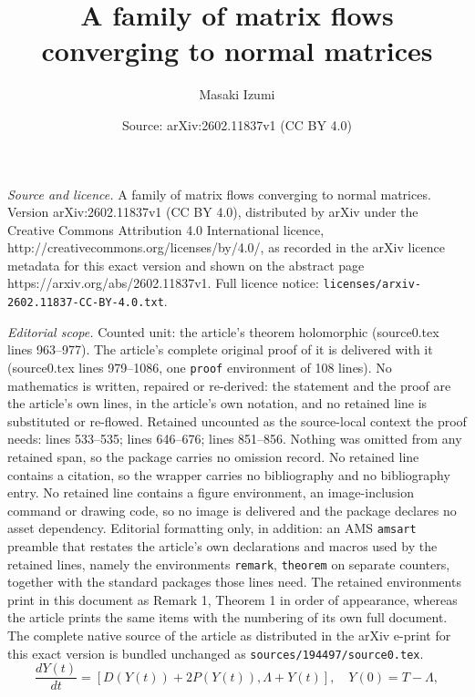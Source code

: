 \documentclass[10pt,a4paper]{amsart}
\title{A family of matrix flows converging to normal matrices}
\author{Masaki Izumi}
\date{Source: arXiv:2602.11837v1 (CC BY 4.0)}
\begin{document}
\maketitle

\noindent\emph{Source and licence.} A family of matrix flows converging to normal matrices. Version arXiv:2602.11837v1 (CC BY 4.0), distributed by arXiv under the Creative Commons Attribution 4.0 International licence, http://creativecommons.org/licenses/by/4.0/, as recorded in the arXiv licence metadata for this exact version and shown on the abstract page https://arxiv.org/abs/2602.11837v1. Full licence notice: \texttt{licenses/arxiv-2602.11837-CC-BY-4.0.txt}.\par\smallskip

\noindent\textit{Editorial scope.} Counted unit: the article's theorem holomorphic (source0.tex lines 963--977). The article's complete original proof of it is delivered with it (source0.tex lines 979--1086, one \texttt{proof} environment of 108 lines). No mathematics is written, repaired or re-derived: the statement and the proof are the article's own lines, in the article's own notation, and no retained line is substituted or re-flowed.  Retained uncounted as the source-local context the proof needs: lines 533--535; lines 646--676; lines 851--856.  Nothing was omitted from any retained span, so the package carries no omission record.  No retained line contains a citation, so the wrapper carries no bibliography and no bibliography entry.  No retained line contains a figure environment, an image-inclusion command or drawing code, so no image is delivered and the package declares no asset dependency.  Editorial formatting only, in addition: an AMS \texttt{amsart} preamble that restates the article's own declarations and macros used by the retained lines, namely the environments \texttt{remark}, \texttt{theorem} on separate counters, together with the standard packages those lines need.  The retained environments print in this document as Remark 1, Theorem 1 in order of appearance, whereas the article prints the same items with the numbering of its own full document.  The complete native source of the article as distributed in the arXiv e-print for this exact version is bundled unchanged as \texttt{sources/194497/source0.tex}.
\begin{equation}\label{upptriflow}
\frac{dY(t)}{dt}=[D(Y(t))+2P(Y(t)),\Lambda+Y(t)],\quad Y(0)=T-\Lambda,
\end{equation}
\end{document}
